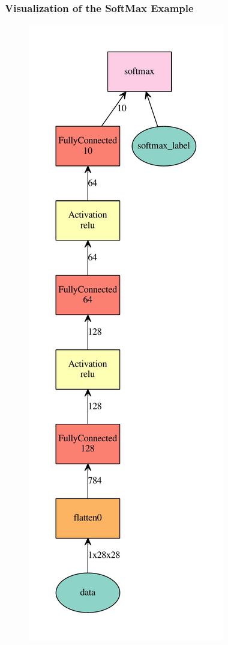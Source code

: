\begin{frame}
	\MyLogo
	\frametitle{Visualization of the SoftMax Example}  
	
\vskip -15pt
\begin{figure}[htbp] 
	\includegraphics[height=0.72\linewidth]{figures/mxnet_graph.pdf} 
\end{figure}
	
\end{frame}